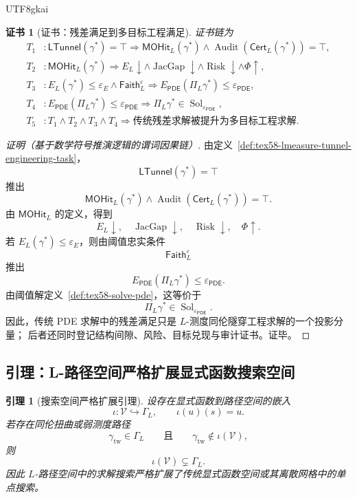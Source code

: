 \documentclass[12pt]{article}
\newtheorem{lemma}{引理}[section]
\newtheorem{Certificate}{证书}[section]
\newcommand{\Vcal}{\mathcal V}
\newcommand{\PDE}{\ensuremath{\mathsf{PDE}}}
\DeclareMathOperator{\Sol}{Sol}
\DeclareMathOperator{\Audit}{Audit}
\DeclareMathOperator{\JacGap}{JacGap}
\DeclareMathOperator{\Risk}{Risk}
\begin{document}
\begin{CJK*}{UTF8}{gkai}
\begin{Certificate}[证书：残差满足到多目标工程满足]
\label{cert:tex58-task-lift}
证书链为
\[
\begin{aligned}
  T_1 &: \mathsf{LTunnel}(\gamma^\ast)=\top
         \Rightarrow
         \mathsf{MOHit}_L(\gamma^\ast)
         \wedge
         \Audit(\mathsf{Cert}_L(\gamma^\ast))=\top,\\
  T_2 &: \mathsf{MOHit}_L(\gamma^\ast)
         \Rightarrow
         E_L\downarrow\wedge\JacGap\downarrow\wedge\Risk\downarrow\wedge\Phi\uparrow,\\
  T_3 &: E_L(\gamma^\ast)\le\varepsilon_E
         \wedge
         \mathsf{Faith}_L^{\varepsilon}
         \Rightarrow
         E_{\PDE}(\Pi_L\gamma^\ast)\le\varepsilon_{\PDE},\\
  T_4 &: E_{\PDE}(\Pi_L\gamma^\ast)\le\varepsilon_{\PDE}
         \Rightarrow
         \Pi_L\gamma^\ast\in\Sol_{\varepsilon_{\PDE}},\\
  T_5 &: T_1\wedge T_2\wedge T_3\wedge T_4
         \Rightarrow
         \text{传统残差求解被提升为多目标工程求解}.
\end{aligned}
\]
\end{Certificate}

\begin{proof}[证明（基于数学符号推演逻辑的谓词因果链）]
由定义~\ref{def:tex58-lmeasure-tunnel-engineering-task}，
\[
  \mathsf{LTunnel}(\gamma^\ast)=\top
\]
推出
\[
  \mathsf{MOHit}_L(\gamma^\ast)
  \wedge
  \Audit(\mathsf{Cert}_L(\gamma^\ast))=\top.
\]
由 \(\mathsf{MOHit}_L\) 的定义，得到
\[
  E_L\downarrow,\quad
  \JacGap\downarrow,\quad
  \Risk\downarrow,\quad
  \Phi\uparrow.
\]
若 \(E_L(\gamma^\ast)\le\varepsilon_E\)，则由阈值忠实条件
\[
  \mathsf{Faith}_L^{\varepsilon}
\]
推出
\[
  E_{\PDE}(\Pi_L\gamma^\ast)\le\varepsilon_{\PDE}.
\]
由阈值解定义~\ref{def:tex58-solve-pde}，这等价于
\[
  \Pi_L\gamma^\ast\in\Sol_{\varepsilon_{\PDE}}.
\]
因此，传统 PDE 求解中的残差满足只是 \(L\)-测度同伦隧穿工程求解的一个投影分量；
后者还同时登记结构间隙、风险、目标兑现与审计证书。证毕。
\end{proof}

\subsection[引理：L-路径搜索空间扩展]{引理：L-路径空间严格扩展显式函数搜索空间}
\label{subsec:tex58-l-path-search-expansion}

\begin{lemma}[搜索空间严格扩展引理]
\label{lem:tex58-l-path-search-expansion}
设存在显式函数到路径空间的嵌入
\[
  \iota:\Vcal\hookrightarrow\Gamma_L,
  \qquad
  \iota(u)(s)=u.
\]
若存在同伦扭曲或弱测度路径
\[
  \gamma_{\mathrm{tw}}\in\Gamma_L
  \qquad\text{且}\qquad
  \gamma_{\mathrm{tw}}\notin\iota(\Vcal),
\]
则
\[
  \iota(\Vcal)\subsetneq\Gamma_L.
\]
因此 \(L\)-路径空间中的求解搜索严格扩展了传统显式函数空间或其离散网格中的单点搜索。
\end{lemma}


\end{CJK*}
\end{document}
